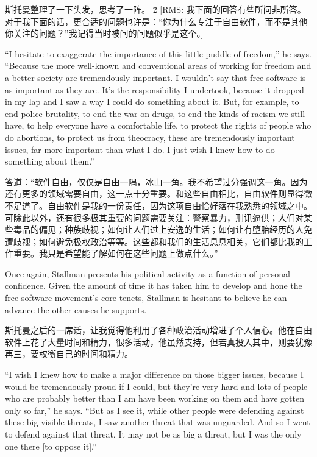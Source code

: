 \ifdefined\chs
斯托曼整理了一下头发，思考了一阵。 \ifdefined\v2 [RMS: 我下面的回答有些所问非所答。对于我下面的话，更合适的问题也许是：``你为什么专注于自由软件，而不是其他你关注的问题？''我记得当时被问的问题似乎是这个。] \fi
\fi

\ifdefined\eng
``I hesitate to exaggerate the importance of this little puddle of freedom,'' he says. ``Because the more well-known and conventional areas of working for freedom and a better society are tremendously important. I wouldn't say that free software is as important as they are. It's the responsibility I undertook, because it dropped in my lap and I saw a way I could do something about it. But, for example, to end police brutality, to end the war on drugs, to end the kinds of racism we still have, to help everyone have a comfortable life, to protect the rights of people who do abortions, to protect us from theocracy, these are tremendously important issues, far more important than what I do. I just wish I knew how to do something about them.''
\fi

\ifdefined\chs
答道：``软件自由，仅仅是自由一隅，冰山一角。我不希望过分强调这一角。因为还有更多的领域需要自由，这一点十分重要。和这些自由相比，自由软件则显得微不足道了。自由软件是我的一份责任，因为这项自由恰好落在我熟悉的领域之中。可除此以外，还有很多极其重要的问题需要关注：警察暴力，刑讯逼供；人们对某些毒品的偏见；种族歧视；如何让人们过上安逸的生活；如何让有堕胎经历的人免遭歧视；如何避免极权政治等等。这些都和我们的生活息息相关，它们都比我的工作重要。我只是希望能了解如何在这些问题上做点什么。''
\fi

\ifdefined\eng
Once again, Stallman presents his political activity as a function of personal confidence. Given the amount of time it has taken him to develop and hone the free software movement's core tenets, Stallman is hesitant to believe he can advance the other causes he supports.
\fi

\ifdefined\chs
斯托曼之后的一席话，让我觉得他利用了各种政治活动增进了个人信心。他在自由软件上花了大量时间和精力，很多活动，他虽然支持，但若真投入其中，则要犹豫再三，要权衡自己的时间和精力。
\fi

\ifdefined\eng
``I wish I knew how to make a major difference on those bigger issues, because I would be tremendously proud if I could, but they're very hard and lots of people who are probably better than I am have been working on them and have gotten only so far,'' he says. ``But as I see it, while other people were defending against these big visible threats, I saw another threat that was unguarded. And so I went to defend against that threat. It may not be as big a threat, but I was the only one there [to oppose it].''
\fi

